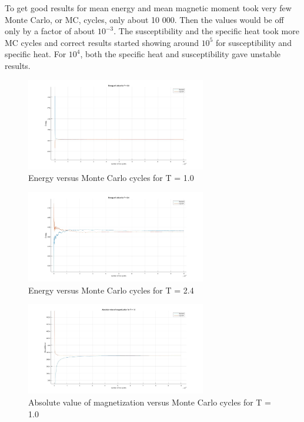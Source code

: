 \documentclass[10pt,a4paper]{article}
\begin{document}
\noindent To get good results for mean energy and mean magnetic moment took very few Monte Carlo, or MC, cycles, only about 10 000. Then the values would be off only by a factor of about $10^{-3}$. The susceptibility and the specific heat took more MC cycles and correct results started showing around $10^{5}$ for susceptibility and specific heat. For $10^4$, both the specific heat and susceptibility gave unstable results.

\begin{figure}[H]
\centerline{
\includegraphics[width=0.7\textwidth]{energy1T}
}
\caption{Energy versus Monte Carlo cycles for T = 1.0}
\label{fig:energy1T}
\end{figure}

\begin{figure}[H]
\centerline{
\includegraphics[width=0.7\textwidth]{energy24T}
}
\caption{Energy versus Monte Carlo cycles for T = 2.4}
\label{fig:energy24T}
\end{figure}

\begin{figure}[H]
\centerline{
\includegraphics[width=0.7\textwidth]{absmag1T}
}
\caption{Absolute value of magnetization versus Monte Carlo cycles for T = 1.0}
\label{fig:absmag1T}
\end{figure}
\end{document}
